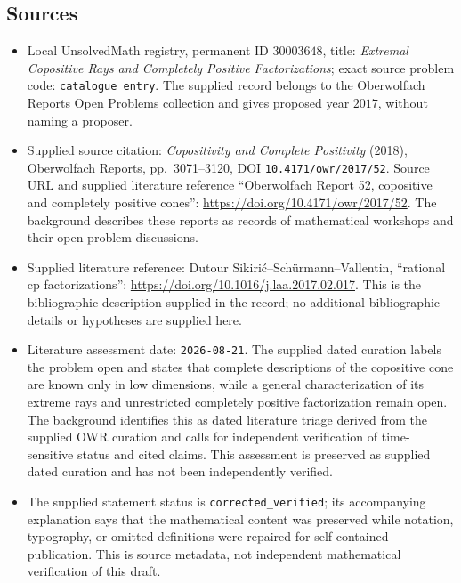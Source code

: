 \documentclass[11pt]{article}
\begin{document}
\subsection{Sources}
\begin{itemize}
\item Local UnsolvedMath registry, permanent ID \(30003648\), title: \emph{Extremal Copositive Rays and Completely Positive Factorizations}; exact source problem code: \texttt{catalogue entry}. The supplied record belongs to the Oberwolfach Reports Open Problems collection and gives proposed year \(2017\), without naming a proposer.
\item Supplied source citation: \emph{Copositivity and Complete Positivity} (2018), Oberwolfach Reports, pp.\ 3071--3120, DOI \texttt{10.4171/owr/2017/52}. Source URL and supplied literature reference ``Oberwolfach Report 52, copositive and completely positive cones'': \url{https://doi.org/10.4171/owr/2017/52}. The background describes these reports as records of mathematical workshops and their open-problem discussions.
\item Supplied literature reference: Dutour Sikiri\'c--Sch\"urmann--Vallentin, ``rational cp factorizations'': \url{https://doi.org/10.1016/j.laa.2017.02.017}. This is the bibliographic description supplied in the record; no additional bibliographic details or hypotheses are supplied here.
\item Literature assessment date: \texttt{2026-08-21}. The supplied dated curation labels the problem open and states that complete descriptions of the copositive cone are known only in low dimensions, while a general characterization of its extreme rays and unrestricted completely positive factorization remain open. The background identifies this as dated literature triage derived from the supplied OWR curation and calls for independent verification of time-sensitive status and cited claims. This assessment is preserved as supplied dated curation and has not been independently verified.
\item The supplied statement status is \texttt{corrected\_verified}; its accompanying explanation says that the mathematical content was preserved while notation, typography, or omitted definitions were repaired for self-contained publication. This is source metadata, not independent mathematical verification of this draft.
\end{itemize}
\end{document}
